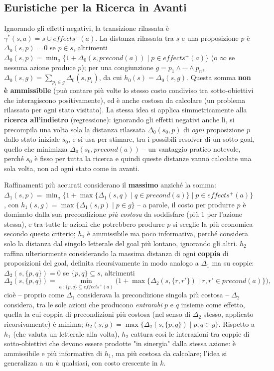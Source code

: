 \documentclass[a4paper,11pt]{article}
\begin{document}
\subsection{Euristiche per la Ricerca in Avanti}

Ignorando gli effetti negativi, la transizione rilassata è $\gamma^*(s,a)=s\cup effects^+(a)$. La distanza rilassata tra $s$ e una proposizione $p$ è $\Delta_0(s,p)=0$ se $p\in s$, altrimenti $\Delta_0(s,p)=\min_a\{1+\Delta_0(s,precond(a))\mid p\in effects^+(a)\}$ (o $\infty$ se nessuna azione produce $p$); per una congiunzione $g=p_1\wedge\cdots\wedge p_n$, $\Delta_0(s,g)=\sum_{p_i\in g}\Delta_0(s,p_i)$, da cui $h_0(s)=\Delta_0(s,g)$. Questa somma \textbf{non è ammissibile} (può contare più volte lo stesso costo condiviso tra sotto-obiettivi che interagiscono positivamente), ed è anche costosa da calcolare (un problema rilassato per ogni stato visitato). La stessa idea si applica simmetricamente alla \textbf{ricerca all'indietro} (regressione): ignorando gli effetti negativi anche lì, si precompila una volta sola la distanza rilassata $\Delta_0(s_0,p)$ di \emph{ogni} proposizione $p$ dallo stato iniziale $s_0$, e si usa per stimare, tra i possibili resolver di un sotto-goal, quello che minimizza $\Delta_0(s_0,precond(a))$ -- un vantaggio pratico notevole, perché $s_0$ è fisso per tutta la ricerca e quindi queste distanze vanno calcolate una sola volta, non ad ogni stato come in avanti.

Raffinamenti più accurati considerano il \textbf{massimo} anziché la somma: $\Delta_1(s,p)=\min_a\{1+\max\{\Delta_1(s,q)\mid q\in precond(a)\}\mid p\in effects^+(a)\}$, con $h_1(s,g)=\max\{\Delta_1(s,p)\mid p\in g\}$ -- a parole, il costo per produrre $p$ è dominato dalla sua precondizione \emph{più costosa} da soddisfare (più 1 per l'azione stessa), e tra tutte le azioni che potrebbero produrre $p$ si sceglie la più economica secondo questo criterio; $h_1$ è ammissibile ma poco informativa, perché considera solo la distanza dal singolo letterale del goal più lontano, ignorando gli altri. $h_2$ raffina ulteriormente considerando la massima distanza di ogni \textbf{coppia} di proposizioni del goal, definita ricorsivamente in modo analogo a $\Delta_1$ ma su coppie: $\Delta_2(s,\{p,q\})=0$ se $\{p,q\}\subseteq s$, altrimenti
\[
\Delta_2(s,\{p,q\}) = \min_{a\,:\,\{p,q\}\subseteq effects^+(a)}\Big(1+\max\{\Delta_2(s,\{r,r'\})\mid r,r'\in precond(a)\}\Big),
\]
cioè -- proprio come $\Delta_1$ considerava la precondizione singola più costosa -- $\Delta_2$ considera, tra le sole azioni che producono \emph{entrambi} $p$ e $q$ insieme come effetto, quella la cui coppia di precondizioni più costosa (nel senso di $\Delta_2$ stesso, applicato ricorsivamente) è minima; $h_2(s,g)=\max\{\Delta_2(s,\{p,q\})\mid p,q\in g\}$. Rispetto a $h_1$ (che valuta un letterale alla volta), $h_2$ cattura così le interazioni tra coppie di sotto-obiettivi che devono essere prodotte "in sinergia" dalla stessa azione: è ammissibile e più informativa di $h_1$, ma più costosa da calcolare; l'idea si generalizza a un $k$ qualsiasi, con costo crescente in $k$.
\end{document}

